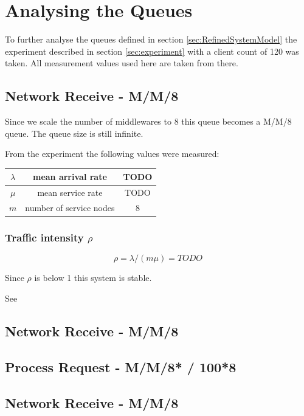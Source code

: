 \documentclass[a4paper]{article}
\begin{document}
\section{Analysing the Queues}

To further analyse the queues defined in section \ref{sec:RefinedSystemModel} the experiment described in section \ref{sec:experiment} with a client count of 120 was taken. All measurement values used here are taken from there.

\subsection{Network Receive - M/M/8}
Since we scale the number of middlewares to 8 this queue becomes a M/M/8 queue. The queue size is still infinite.


From the experiment the following values were measured:

\begin{tabular}{|c|c|c|}
\hline 
$\lambda$ & mean arrival rate & TODO \\ 
\hline 
$\mu$ & mean service rate & TODO \\ 
\hline 
$m$ & number of service nodes & 8 \\ 
\hline 
\end{tabular} 

\subsubsection{Traffic intensity $\rho$}

$$ \rho = \lambda / (m \mu) = TODO$$

Since $\rho$ is below 1 this system is stable.


See \cite[Box 31.2]{Raj}


\subsection{Network Receive - M/M/8}

\subsection{Process Request - M/M/8* / 100*8}

\subsection{Network Receive - M/M/8}
\end{document}
